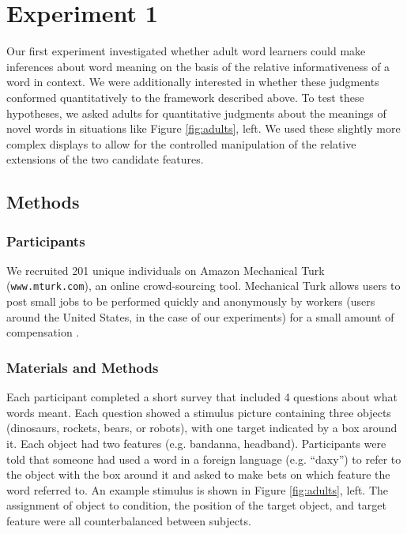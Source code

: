 \documentclass[man,noapacite]{apa2}
\begin{document}
\section{Experiment 1}


Our first experiment investigated whether adult word learners could make inferences about word meaning on the basis of the relative informativeness of a word in context. We were additionally interested in whether these judgments conformed quantitatively to the framework described above. To test these hypotheses, we asked adults for quantitative judgments about the meanings of novel words in situations like Figure \ref{fig:adults}, left. We used these slightly more complex displays to allow for the controlled manipulation of the relative extensions of the two candidate features.

\subsection{Methods}

\subsubsection{Participants}

We recruited 201 unique individuals on Amazon Mechanical Turk (\texttt{www.mturk.com}), an online crowd-sourcing tool. Mechanical Turk allows users to post small jobs to be performed quickly and anonymously by workers (users around the United States, in the case of our experiments) for a small amount of compensation \cite{buhrmester2011,crump2013}. 

\subsubsection{Materials and Methods}

Each participant completed a short survey that included 4 questions about what words meant. Each question showed a stimulus picture containing three objects (dinosaurs, rockets, bears, or robots), with one target indicated by a box around it. Each object had two features (e.g. bandanna, headband). Participants were told that someone had used a word in a foreign language (e.g. ``daxy'') to refer to the object with the box around it and asked to make bets on which feature the word referred to. An example stimulus is shown in Figure \ref{fig:adults}, left. The assignment of object to condition, the position of the target object, and target feature were all counterbalanced between subjects. 
\end{document}
